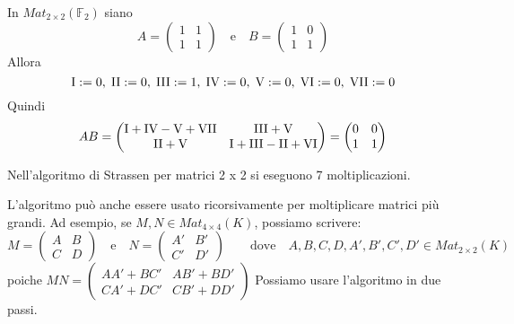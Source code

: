 \documentclass[../main.tex]{subfiles}
\begin{document}
\begin{example}
    In $Mat_{2 \times 2}(\mathbb{F}_2)$ siano
    \begin{equation*}
        A = \begin{pmatrix} 1 & 1 \\ 1 & 1 \end{pmatrix} \quad \text{e} \quad B = \begin{pmatrix} 1 & 0 \\ 1 & 1 \end{pmatrix}
    \end{equation*}
    Allora
    \begin{equation*}
        \RomanNumber 1 := 0, \;
        \RomanNumber 2 := 0, \;
        \RomanNumber 3 := 1, \;
        \RomanNumber 4 := 0, \;
        \RomanNumber 5  := 0, \;
        \RomanNumber 6  := 0, \;
        \RomanNumber 7  := 0
    \end{equation*}
    Quindi
    \begin{equation*}
        AB = \begin{pmatrix} \RomanNumber 1 + \RomanNumber 4 - \RomanNumber 5 + \RomanNumber 7 & \RomanNumber 3 + \RomanNumber 5 \\ \RomanNumber 2 + \RomanNumber 5 & \RomanNumber 1 + \RomanNumber 3 - \RomanNumber 2 + \RomanNumber 6 \end{pmatrix} =
        \begin{pmatrix} 0 & 0 \\ 1 & 1 \end{pmatrix}
    \end{equation*}
\end{example}

Nell'algoritmo di Strassen per matrici 2 x 2 si eseguono 7 moltiplicazioni.

L'algoritmo può anche essere usato ricorsivamente per moltiplicare matrici più grandi. Ad esempio, se $M, N \in Mat_{4 \times 4}(K)$, possiamo scrivere:
\begin{equation*}
    M = \begin{pmatrix} A & B \\ C & D \end{pmatrix} \quad \text{e} \quad N = \begin{pmatrix} A' & B' \\ C' & D' \end{pmatrix} \qquad
    \text{dove} \quad A, B, C, D, A', B', C', D' \in Mat_{2 \times 2}(K)
\end{equation*}
poiche $MN = \begin{pmatrix} AA' + BC' & AB' + BD' \\ CA' + DC' & CB' + DD' \end{pmatrix}$
Possiamo usare l'algoritmo in due passi.
\end{document}
